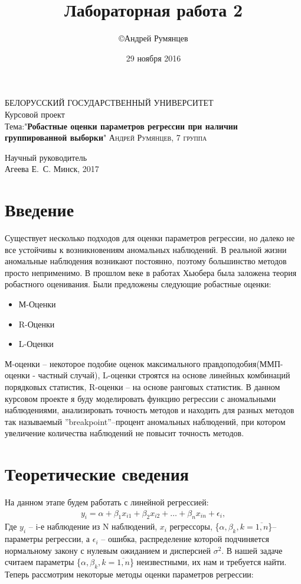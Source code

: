 \documentclass[12pt]{article}
\title{Лабораторная работа 2}
\author{\copyright Андрей Румянцев}
\date{29 ноября 2016}
\begin{document}
\begin{titlepage}
	\thispagestyle{empty}
    \begin{center}
        {\large БЕЛОРУССКИЙ ГОСУДАРСТВЕННЫЙ УНИВЕРСИТЕТ \break}
		{\\ \LARGE Курсовой проект \vspace{2in}}
		{\\ \large Тема:"\textbf{Робастные оценки параметров регрессии при наличии группированной выборки}" \break}
		{\newline \textsc{Андрей Румянцев, 7 группа}}
	\end{center}
	
	\vfill
		{\raggedleft Научный руководитель\\}
		{\hfill  Агеева Е.~С.}\break
		\center Минск, 2017
\end{titlepage}

\newpage

\section{Введение}
Существует несколько подходов для оценки параметров регрессии, но далеко не все устойчивы к возникновениям аномальных наблюдений.
В реальной жизни аномальные наблюдения возникают постоянно, поэтому большинство методов просто неприменимо.
В прошлом веке в работах Хьюбера была заложена теория робастного оценивания.\hfill\break
Были предложены следующие робастные оценки:\hfill\break
\begin{itemize}
    \item М-Оценки\\
    \item R-Оценки\\
    \item L-Оценки
\end{itemize}
М-оценки -- некоторое подобие оценок максимального правдоподобия(ММП-оценки - частный случай), L-оценки строятся на основе линейных комбинаций порядковых статистик, R-оценки -- на основе ранговых статистик.
В данном курсовом проекте я буду моделировать функцию регрессии с аномальными наблюдениями, анализировать точность методов и находить для разных методов так называемый ''breakpoint''--процент аномальных наблюдений, при котором увеличение количества наблюдений не повысит точность методов.


\section{Теоретические сведения}
На данном этапе будем работать с линейной регрессией:\hfill\break
\begin{eqnarray}
    y_i=\alpha+\beta_1 x_{i1}+\beta_2 x_{i2}+\dots+\beta_n x_{in}+\epsilon_i,
\end{eqnarray}
Где $y_i$ -- i-е наблюдение из N наблюдений, $x_i$ регрессоры, \{$\alpha,\beta_k, k=\overline{1,n}$\}-- параметры регрессии, а $\epsilon_i$ -- ошибка, распределение которой подчиняется нормальному закону с нулевым ожиданием и дисперсией $\sigma^2$.\hfill\break
В нашей задаче считаем параметры \{$\alpha,\beta_k, k=\overline{1,n}$\} неизвестными, их нам и требуется найти.\hfill\break
Теперь рассмотрим некоторые методы оценки параметров регрессии:
\end{document}
